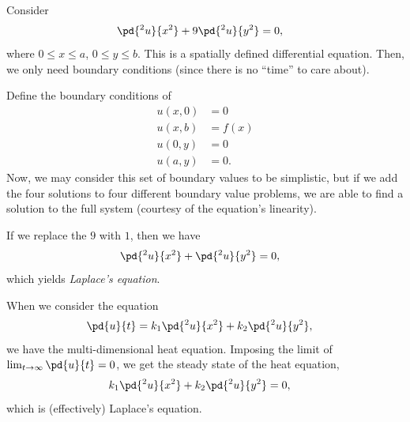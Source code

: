 \documentclass[10pt]{mypackage}
\begin{document}
\begin{example}
  Consider
  \begin{align*}
    \pd{^2u}{x^2} + 9 \pd{^2u}{y^2} &= 0,
  \end{align*}
  where $0 \leq x \leq a$, $0\leq y \leq b$. This is a spatially defined differential equation. Then, we only need boundary conditions (since there is no ``time'' to care about).\newline

  Define the boundary conditions of
  \begin{align*}
    u\left( x,0 \right) &= 0\\
    u\left( x,b \right) &= f(x)\\
    u\left( 0,y \right) &= 0\\
    u\left( a,y \right) &= 0.
  \end{align*}
  Now, we may consider this set of boundary values to be simplistic, but if we add the four solutions to four different boundary value problems, we are able to find a solution to the full system (courtesy of the equation's linearity).\newline

  If we replace the $9$ with $1$, then we have
  \begin{align*}
    \pd{^2u}{x^2} + \pd{^2u}{y^2} &= 0,
  \end{align*}
  which yields \textit{Laplace's equation}.
\end{example}
\begin{example}
  When we consider the equation
  \begin{align*}
    \pd{u}{t} &= k_1\pd{^2u}{x^2} + k_2\pd{^2u}{y^2},
  \end{align*}
  we have the multi-dimensional heat equation. Imposing the limit of $\lim_{t\rightarrow\infty} \pd{u}{t} = 0$, we get the steady state of the heat equation,
  \begin{align*}
    k_1\pd{^2u}{x^2} + k_2\pd{^2u}{y^2} &= 0,
  \end{align*}
  which is (effectively) Laplace's equation.
\end{example}
\end{document}
